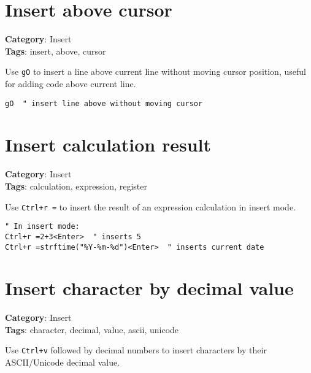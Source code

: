 {{{{{{\section{Insert above cursor}

\textbf{Category}: Insert\\ \textbf{Tags}: insert, above, cursor
\vspace{0.5cm}

Use {\footnotesize \Verb§gO§} to insert a line above current line without moving cursor position, useful for adding code above current line.

\begin{Exa*}{}
\begin{Verbatim}[fontsize=\footnotesize, breaklines, breakanywhere]
gO  " insert line above without moving cursor
\end{Verbatim}
\end{Exa*}

\section{Insert calculation result}

\textbf{Category}: Insert\\ \textbf{Tags}: calculation, expression, register
\vspace{0.5cm}

Use {\footnotesize \Verb§Ctrl+r =§} to insert the result of an expression calculation in insert mode.

\begin{Exa*}{}
\begin{Verbatim}[fontsize=\footnotesize, breaklines, breakanywhere]
" In insert mode:
Ctrl+r =2+3<Enter>  " inserts 5
Ctrl+r =strftime("%Y-%m-%d")<Enter>  " inserts current date
\end{Verbatim}
\end{Exa*}

\section{Insert character by decimal value}

\textbf{Category}: Insert\\ \textbf{Tags}: character, decimal, value, ascii, unicode
\vspace{0.5cm}

Use {\footnotesize \Verb§Ctrl+v§} followed by decimal numbers to insert characters by their ASCII/Unicode decimal value.

}}}}}}

